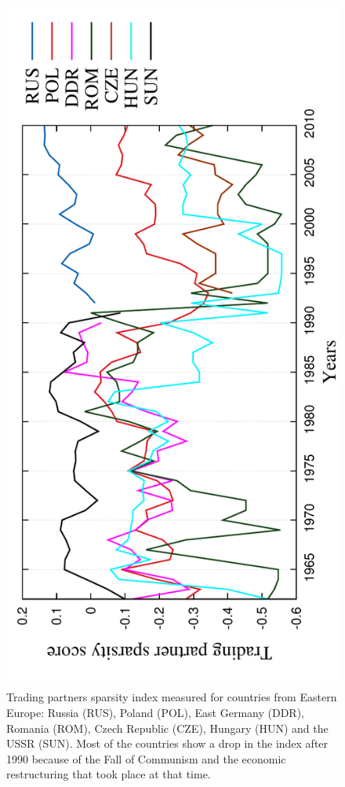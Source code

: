 \begin{figure}[H]
  \centering
\includegraphics[angle=-90,scale=0.6]{../code/extra_results/trading_partner_density/scores/eastern_europe2.pdf}
\caption[Trading partners sparsity index -- Russia (RUS), Poland (POL), East Germany (DDR), Romania (ROM), Czech Republic (CZE), Hungary (HUN) and the USSR (SUN)]{Trading partners sparsity index measured for countries from Eastern Europe: Russia (RUS), Poland (POL), East Germany (DDR), Romania (ROM), Czech Republic (CZE), Hungary (HUN) and the USSR (SUN). Most of the countries show a drop in the index after 1990 because of the Fall of Communism and the economic restructuring that took place at that time.}
\label{eastern_europe_sparsity_index}
\end{figure}

